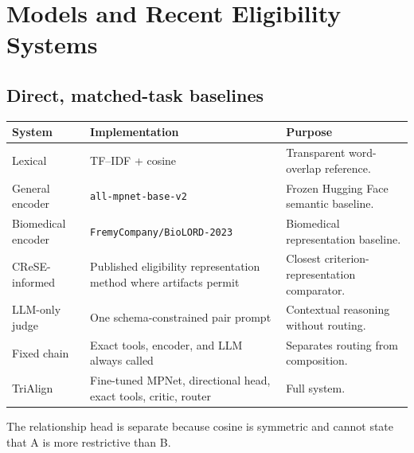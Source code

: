 \documentclass[10pt]{article}
\newcommand{\code}[1]{\texttt{#1}}
\begin{document}
\section{Models and Recent Eligibility Systems}
\subsection{Direct, matched-task baselines}
\begin{longtable}{p{.22\linewidth}p{.31\linewidth}p{.38\linewidth}}\toprule
System & Implementation & Purpose\\\midrule
Lexical & TF--IDF + cosine & Transparent word-overlap reference.\\
General encoder & \code{all-mpnet-base-v2} & Frozen Hugging Face semantic baseline.\\
Biomedical encoder & \code{FremyCompany/BioLORD-2023} & Biomedical representation baseline.\\
CReSE-informed & Published eligibility representation method where artifacts permit \cite{crese} & Closest criterion-representation comparator.\\
LLM-only judge & One schema-constrained pair prompt & Contextual reasoning without routing.\\
Fixed chain & Exact tools, encoder, and LLM always called & Separates routing from composition.\\
TriAlign & Fine-tuned MPNet, directional head, exact tools, critic, router & Full system.\\\bottomrule
\end{longtable}

The relationship head is separate because cosine is symmetric and cannot state that A is more restrictive than B.
\end{document}
